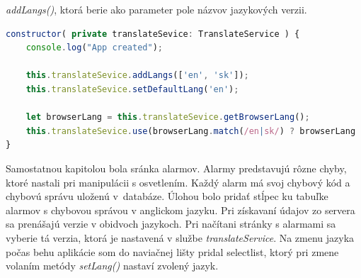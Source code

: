 \documentclass[11pt, oneside]{report}
\begin{document}
\textit{addLangs()}, ktorá berie ako parameter pole názvov jazykových verzii.
\begin{lstlisting}[language=Javascript,showstringspaces=false, caption=Nastavenie jazyka v konštruktore,captionpos=b]
constructor( private translateSevice: TranslateService ) {
    console.log("App created");
	
    this.translateSevice.addLangs(['en', 'sk']);
    this.translateSevice.setDefaultLang('en');
	
    let browserLang = this.translateSevice.getBrowserLang();
    this.translateSevice.use(browserLang.match(/en|sk/) ? browserLang : 'en');
}
\end{lstlisting}
Samostatnou kapitolou bola sránka alarmov. Alarmy predstavujú  rôzne chyby, ktoré nastali pri manipulácii s osvetlením. Každý alarm má svoj chybový kód a  chybovú správu uloženú v~databáze. Úlohou bolo  pridať stĺpec ku tabuľke alarmov  s chybovou  správou v anglickom jazyku. Pri získavaní údajov zo servera sa prenášajú   verzie v obidvoch jazykoch. Pri načítani stránky s alarmami sa vyberie tá verzia, ktorá je nastavená v službe \textit{translateService}. Na zmenu jazyka počas behu aplikácie som do naviačnej lišty pridal  selectlist, ktorý  pri zmene volaním metódy \textit{setLang()} nastaví zvolený jazyk.
\end{document}
